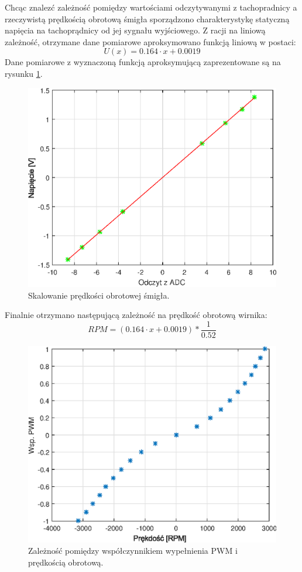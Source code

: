 Chcąc znalezć zależność pomiędzy wartościami odczytywanymi z tachopradnicy a rzeczywistą prędkością obrotową śmigła sporządzono charakterystykę statyczną napięcia na tachoprądnicy od jej sygnału wyjściowego. Z racji na liniową zależność, otrzymane dane pomiarowe aproksymowano funkcją liniową w postaci:
\begin{equation}\label{key}
U(x) = 0.164 \cdot x + 0.0019
\end{equation}
Dane pomiarowe z wyznaczoną funkcją aproksymującą zaprezentowane są na rysunku \ref{skal_pred}.
\begin{figure}[h!]
	\centering
	\includegraphics[scale = 1]{fig/skal_predkosci.eps}
	\caption		
	{Skalowanie prędkości obrotowej śmigła.}
	\label{skal_pred}
\end{figure}
Finalnie otrzymano następującą zależność na prędkość obrotową wirnika: 
\begin{equation}\label{key}
RPM = (0.164 \cdot x + 0.0019 ) * \frac{1}{0.52}
\end{equation}
\begin{figure}[h!]
	\centering
	\includegraphics[scale = 1]{fig/PWM_predkosci.eps}
	\caption		
	{Zależność pomiędzy współczynnikiem wypełnienia PWM i prędkością obrotową.}
	\label{PWM_pred}
\end{figure}

